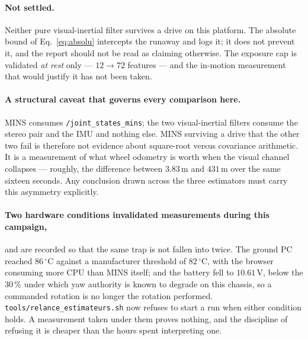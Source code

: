 \paragraph{Not settled.} Neither pure visual-inertial filter survives a drive
on this platform. The absolute bound of Eq.~\eqref{eq:absolu} intercepts the
runaway and logs it; it does not prevent it, and the report should not be read
as claiming otherwise. The exposure cap is validated \emph{at rest} only ---
$12\rightarrow72$ features --- and the in-motion measurement that would
justify it has not been taken.

\paragraph{A structural caveat that governs every comparison here.} MINS
consumes \texttt{/joint\_states\_mins}; the two visual-inertial filters
consume the stereo pair and the IMU and nothing else. MINS surviving a drive
that the other two fail is therefore not evidence about square-root versus
covariance arithmetic. It is a measurement of what wheel odometry is worth
when the visual channel collapses --- roughly, the difference between
$3.83$\,m and $431$\,m over the same sixteen seconds. Any conclusion drawn
across the three estimators must carry this asymmetry explicitly.

\paragraph{Two hardware conditions invalidated measurements during this
campaign,} and are recorded so that the same trap is not fallen into twice.
The ground PC reached $86\,^{\circ}$C against a manufacturer threshold of
$82\,^{\circ}$C, with the browser consuming more CPU than MINS itself; and the
battery fell to $10.61$\,V, below the $30\,\%$ under which yaw authority is
known to degrade on this chassis, so a commanded rotation is no longer the
rotation performed. \texttt{tools/relance\_estimateurs.sh} now refuses to
start a run when either condition holds. A measurement taken under them
proves nothing, and the discipline of refusing it is cheaper than the hours
spent interpreting one.
